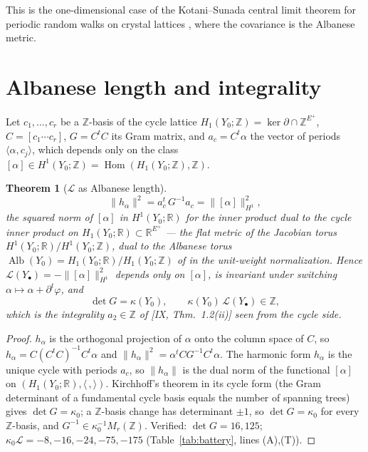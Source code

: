 \documentclass[11pt]{amsart}
\numberwithin{equation}{section}
\newtheorem{theorem}{Theorem}[section]
\theoremstyle{definition}
\theoremstyle{remark}
\newcommand{\Z}{\mathbb{Z}}
\newcommand{\R}{\mathbb{R}}
\newcommand{\cL}{\mathcal{L}}
\newcommand{\Alb}{\operatorname{Alb}}
\begin{document}
This is the one-dimensional case of the Kotani--Sunada central limit theorem for periodic
random walks on crystal lattices \cite{KS1}, where the covariance is the Albanese metric.

\section{Albanese length and integrality}\label{sec:albanese}

Let $c_1,\dots,c_r$ be a $\Z$-basis of the cycle lattice $H_1(Y_0;\Z)=\ker\partial\cap\Z^{E^{+}}$,
$C=[c_1\cdots c_r]$, $G=C^{t}C$ its Gram matrix, and $a_c=C^{t}\alpha$ the vector of
periods $\langle\alpha,c_j\rangle$, which depends only on the class $[\alpha]\in H^{1}(Y_0;\Z)
=\operatorname{Hom}(H_1(Y_0;\Z),\Z)$.

\begin{theorem}[$\cL$ as Albanese length]\label{thm:albanese}
\[
\|h_\alpha\|^{2}=a_c^{t}\,G^{-1}a_c=\bigl\|[\alpha]\bigr\|^{2}_{H^{1}},
\]
the squared norm of $[\alpha]$ in $H^{1}(Y_0;\R)$ for the inner product dual to the cycle
inner product on $H_1(Y_0;\R)\subset\R^{E^{+}}$ --- the flat metric of the Jacobian torus
$H^{1}(Y_0;\R)/H^{1}(Y_0;\Z)$, dual to the Albanese torus
$\Alb(Y_0)=H_1(Y_0;\R)/H_1(Y_0;\Z)$ of \cite{KS2} in the unit-weight normalization. Hence
$\cL(Y_\bullet)=-\|[\alpha]\|^{2}_{H^{1}}$ depends only on $[\alpha]$, is invariant under
switching $\alpha\mapsto\alpha+\partial^{t}\varphi$, and
\[
\det G=\kappa(Y_0),\qquad \kappa(Y_0)\,\cL(Y_\bullet)\in\Z ,
\]
which is the integrality $a_2\in\Z$ of {\rm[IX, Thm.~1.2(ii)]} seen from the cycle side.
\end{theorem}

\begin{proof}
$h_\alpha$ is the orthogonal projection of $\alpha$ onto the column space of $C$, so
$h_\alpha=C(C^{t}C)^{-1}C^{t}\alpha$ and $\|h_\alpha\|^{2}=\alpha^{t}CG^{-1}C^{t}\alpha$. The
harmonic form $h_\alpha$ is the unique cycle with periods $a_c$, so $\|h_\alpha\|$ is the
dual norm of the functional $[\alpha]$ on $(H_1(Y_0;\R),\langle\,,\rangle)$. Kirchhoff's
theorem in its cycle form (the Gram determinant of a fundamental cycle basis equals the
number of spanning trees) gives $\det G=\kappa_0$; a $\Z$-basis change has determinant $\pm1$,
so $\det G=\kappa_0$ for every $\Z$-basis, and $G^{-1}\in\kappa_0^{-1}M_r(\Z)$. Verified:
$\det G=16,125$; $\kappa_0\cL=-8,-16,-24,-75,-175$ (Table~\ref{tab:battery}, lines (A),(T)).
\end{proof}
\end{document}
